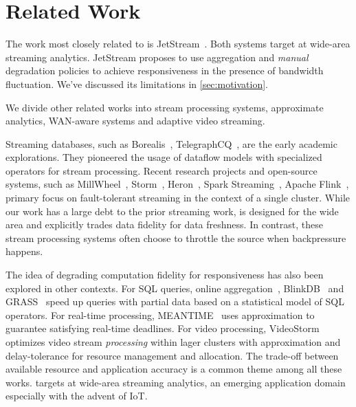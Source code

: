 \section{Related Work}
\label{sec:related-work}

The work most closely related to \sysname{} is
JetStream~\cite{rabkin2014aggregation}. Both systems target at wide-area
streaming analytics. JetStream proposes to use aggregation and \textit{manual}
degradation policies to achieve responsiveness in the presence of bandwidth
fluctuation. We've discussed its limitations in \autoref{sec:motivation}.

We divide other related works into stream processing systems, approximate
analytics, WAN-aware systems and adaptive video streaming.

 Streaming databases, such as
Borealis~\cite{abadi2005design},
TelegraphCQ~\cite{chandrasekaran2003telegraphcq}, are the early academic
explorations. They pioneered the usage of dataflow models with specialized
operators for stream processing. Recent research projects and open-source
systems, such as MillWheel~\cite{akidau2013millwheel},
Storm~\cite{toshniwal2014storm}, Heron~\cite{sanjeev2015twitter}, Spark
Streaming~\cite{zaharia2013discretized}, Apache Flink~\cite{carbone2015apache},
primary focus on fault-tolerant streaming in the context of a single
cluster. While our work has a large debt to the prior streaming work, \sysname{}
is designed for the wide area and explicitly trades data fidelity for data
freshness. In contrast, these stream processing systems often choose to throttle
the source when backpressure happens.

 The idea of degrading computation fidelity for
responsiveness has also been explored in other contexts. For SQL queries, online
aggregation~\cite{hellerstein1997online}, BlinkDB~\cite{agarwal2013blinkdb} and
GRASS~\cite{ananthanarayanan2014grass} speed up queries with partial data based
on a statistical model of SQL operators. For real-time processing,
MEANTIME~\cite{farrell2016meantime} uses approximation to guarantee satisfying
real-time deadlines. For video processing, VideoStorm~\cite{zhang2017live}
optimizes video stream \textit{processing} within lager clusters with
approximation and delay-tolerance for resource management and allocation. The
trade-off between available resource and application accuracy is a common theme
among all these works. \sysname{} targets at wide-area streaming analytics, an
emerging application domain especially with the advent of IoT.

